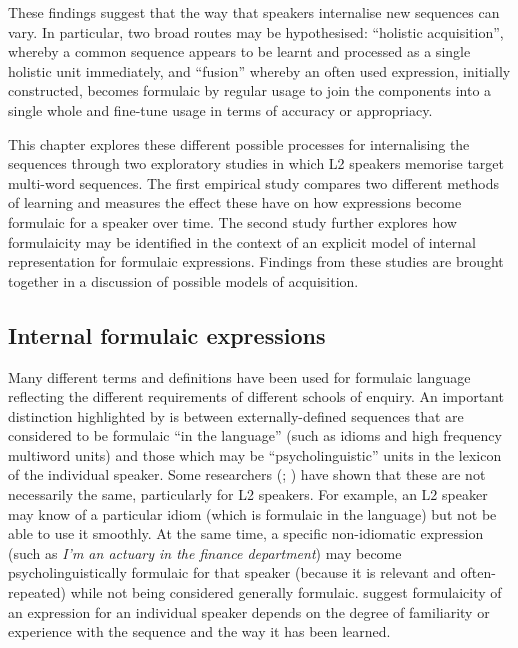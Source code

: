 \documentclass[output=paper]{langscibook}
\begin{document}
These findings suggest that the way that speakers internalise new sequences can vary. In particular, two broad routes may be hypothesised: ``holistic acquisition'', whereby a common sequence appears to be learnt and processed as a single holistic unit immediately, and ``fusion'' whereby an often used expression, initially constructed, becomes formulaic by regular usage to join the components into a single whole and fine-tune usage in terms of accuracy or appropriacy. 

This chapter explores these different possible processes for internalising the sequences through two exploratory studies in which L2 speakers memorise target multi-word sequences. The first empirical study compares two different methods of learning and measures the effect these have on how expressions become formulaic for a speaker over time. The second study further explores how formulaicity may be identified in the context of an explicit model of internal representation for formulaic expressions. Findings from these studies are brought together in a discussion of possible models of acquisition. 

\subsection{Internal formulaic expressions}\label{sec:cutler:1.2}

Many different terms and definitions have been used for formulaic language reflecting the different requirements of different schools of enquiry. An important distinction highlighted by \citet{Wray2008} is between externally-defined sequences that are considered to be formulaic ``in the language'' (such as idioms and high frequency multiword units) and those which may be ``psycholinguistic'' units in the lexicon of the individual speaker. Some researchers (\citealt{Dahlmann2009}; \citealt{Erman2007}) have shown that these are not necessarily the same, particularly for L2 speakers. For example, an L2 speaker may know of a particular idiom (which is formulaic in the language) but not be able to use it smoothly. At the same time, a specific non-idiomatic expression (such as \textit{I’m an actuary in the finance department}) may become psycholinguistically formulaic for that speaker (because it is relevant and often-repeated) while not being considered generally formulaic. \citet{TabossiEtAl2009} suggest formulaicity of an expression for an individual speaker depends on the degree of familiarity or experience with the sequence and the way it has been learned.
\end{document}
